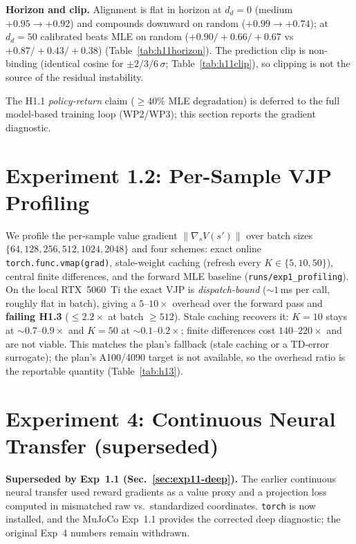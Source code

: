 \documentclass{article}
\theoremstyle{plain}
\begin{document}
\textbf{Horizon and clip.} Alignment is flat in horizon at $d_d = 0$ (medium
$+0.95 \to +0.92$) and compounds downward on random ($+0.99 \to +0.74$); at $d_d = 50$
calibrated beats MLE on random ($+0.90/+0.66/+0.67$ vs $+0.87/+0.43/+0.38$)
(Table~\ref{tab:h11horizon}). The prediction clip is non-binding (identical cosine for
$\pm 2/3/6\,\sigma$; Table~\ref{tab:h11clip}), so clipping is not the source of the
residual instability.

The H1.1 \emph{policy-return} claim ($\ge 40\%$ MLE degradation) is deferred to the full
model-based training loop (WP2/WP3); this section reports the gradient diagnostic.

\section{Experiment 1.2: Per-Sample VJP Profiling}
\label{sec:exp12-profiling}

We profile the per-sample value gradient $\lVert \nabla_s V(s')\rVert$ over batch sizes
$\{64, 128, 256, 512, 1024, 2048\}$ and four schemes: exact online
\texttt{torch.func.vmap(grad)}, stale-weight caching (refresh every $K \in \{5, 10, 50\}$),
central finite differences, and the forward MLE baseline
(\texttt{runs/exp1\_profiling}). On the local RTX~5060~Ti the exact VJP is
\emph{dispatch-bound} ($\sim 1$\,ms per call, roughly flat in batch), giving a
$5$--$10\times$ overhead over the forward pass and \textbf{failing H1.3} ($\le 2.2\times$
at batch $\ge 512$). Stale caching recovers it: $K = 10$ stays at $\sim 0.7$--$0.9\times$
and $K = 50$ at $\sim 0.1$--$0.2\times$; finite differences cost $140$--$220\times$ and
are not viable. This matches the plan's fallback (stale caching or a TD-error surrogate);
the plan's A100/4090 target is not available, so the overhead ratio is the reportable
quantity (Table~\ref{tab:h13}).

\section{Experiment 4: Continuous Neural Transfer (superseded)}

\textbf{Superseded by Exp~1.1 (Sec.~\ref{sec:exp11-deep}).} The earlier continuous
neural transfer used reward gradients as a value proxy and a projection loss computed in
mismatched raw vs.\ standardized coordinates. \texttt{torch} is now installed, and the
MuJoCo Exp~1.1 provides the corrected deep diagnostic; the original Exp~4 numbers
remain withdrawn.
\end{document}
